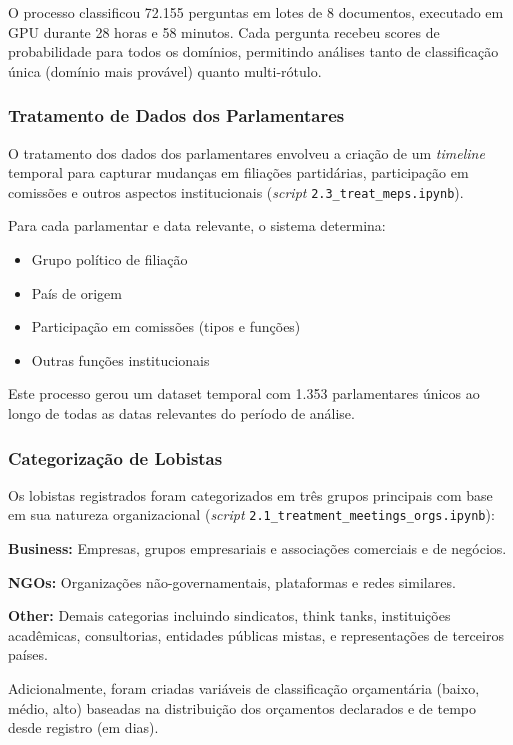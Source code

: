 O processo classificou 72.155 perguntas em lotes de 8 documentos, executado em GPU durante 28 horas e 58 minutos. Cada pergunta recebeu scores de probabilidade para todos os domínios, permitindo análises tanto de classificação única (domínio mais provável) quanto multi-rótulo.

\subsubsection{Tratamento de Dados dos Parlamentares}

O tratamento dos dados dos parlamentares envolveu a criação de um \textit{timeline} temporal para capturar mudanças em filiações partidárias, participação em comissões e outros aspectos institucionais (\textit{script} \texttt{2.3\_treat\_meps.ipynb}).

Para cada parlamentar e data relevante, o sistema determina:
\begin{itemize}
    \item Grupo político de filiação
    \item País de origem
    \item Participação em comissões (tipos e funções)
    \item Outras funções institucionais
\end{itemize}

Este processo gerou um dataset temporal com 1.353 parlamentares únicos ao longo de todas as datas relevantes do período de análise.

\subsubsection{Categorização de Lobistas}

Os lobistas registrados foram categorizados em três grupos principais com base em sua natureza organizacional (\textit{script} \texttt{2.1\_treatment\_meetings\_orgs.ipynb}):

\textbf{Business:} Empresas, grupos empresariais e associações comerciais e de negócios.

\textbf{NGOs:} Organizações não-governamentais, plataformas e redes similares.

\textbf{Other:} Demais categorias incluindo sindicatos, think tanks, instituições acadêmicas, consultorias, entidades públicas mistas, e representações de terceiros países.

Adicionalmente, foram criadas variáveis de classificação orçamentária (baixo, médio, alto) baseadas na distribuição dos orçamentos declarados e de tempo desde registro (em dias).


